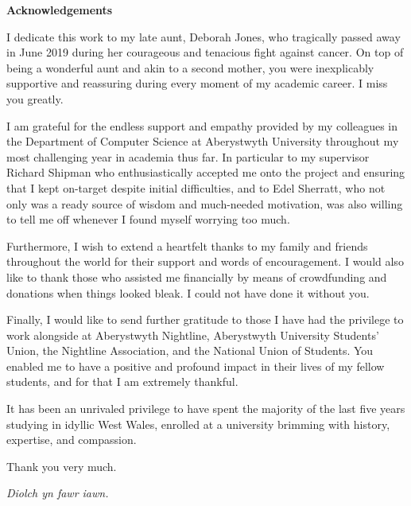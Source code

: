 \thispagestyle{empty}


\begin{center}
    {\LARGE\bf Acknowledgements}
\end{center}

I dedicate this work to my late aunt, Deborah Jones, who tragically passed away in June 2019 during her courageous and tenacious fight against cancer. On top of being a wonderful aunt and akin to a second mother, you were inexplicably supportive and reassuring during every moment of my academic career. I miss you greatly.

I am grateful for the endless support and empathy provided by my colleagues in the Department of Computer Science at Aberystwyth University throughout my most challenging year in academia thus far. In particular to my supervisor Richard Shipman who enthusiastically accepted me onto the project and ensuring that I kept on-target despite initial difficulties, and to Edel Sherratt, who not only was a ready source of wisdom and much-needed motivation, was also willing to tell me off whenever I found myself worrying too much.

Furthermore, I wish to extend a heartfelt thanks to my family and friends throughout the world for their support and words of encouragement. I would also like to thank those who assisted me financially by means of crowdfunding and donations when things looked bleak. I could not have done it without you.

Finally, I would like to send further gratitude to those I have had the privilege to work alongside at Aberystwyth Nightline, Aberystwyth University Students' Union, the Nightline Association, and the National Union of Students. You enabled me to have a positive and profound impact in their lives of my fellow students, and for that I am extremely thankful.

It has been an unrivaled privilege to have spent the majority of the last five years studying in idyllic West Wales, enrolled at a university brimming with history, expertise, and compassion.

\noindent Thank you very much.

\noindent \textit{Diolch yn fawr iawn.}

